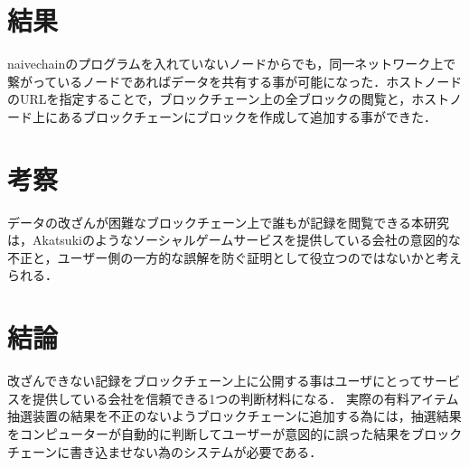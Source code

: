 \documentclass[uplatex,twocolumn,dvipdfmx]{jsarticle}
\begin{document}
\section{結果}

naivechainのプログラムを入れていないノードからでも，同一ネットワーク上で繋がっているノードであればデータを共有する事が可能になった．ホストノードのURLを指定することで，ブロックチェーン上の全ブロックの閲覧と，ホストノード上にあるブロックチェーンにブロックを作成して追加する事ができた．

\section{考察}

データの改ざんが困難なブロックチェーン上で誰もが記録を閲覧できる本研究は，Akatsukiのようなソーシャルゲームサービスを提供している会社の意図的な不正と，ユーザー側の一方的な誤解を防ぐ証明として役立つのではないかと考えられる．

\section{結論}
改ざんできない記録をブロックチェーン上に公開する事はユーザにとってサービスを提供している会社を信頼できる1つの判断材料になる．
実際の有料アイテム抽選装置の結果を不正のないようブロックチェーンに追加する為には，抽選結果をコンピューターが自動的に判断してユーザーが意図的に誤った結果をブロックチェーンに書き込ませない為のシステムが必要である．





\end{document}
